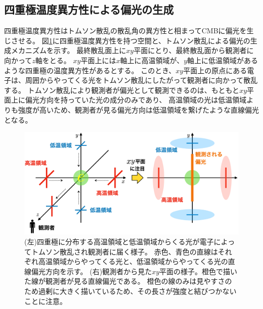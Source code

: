 \documentclass[../../main.tex]{subfiles}
\begin{document}
\subsection{四重極温度異方性による偏光の生成}
四重極温度異方性はトムソン散乱の散乱角の異方性と相まってCMBに偏光を生じさせる。
図\ref{fig:thomson_polarization}に四重極温度異方性を持つ空間と、トムソン散乱による偏光の生成メカニズムを示す。
最終散乱面上に$xy$平面にとり、最終散乱面から観測者に向かって$z$軸をとる。
$xy$平面上には$x$軸上に高温領域が、$y$軸上に低温領域があるような四重極の温度異方性があるとする。
このとき、$xy$平面上の原点にある電子は、周囲からやってくる光をトムソン散乱にしたがって観測者に向かって散乱する。
トムソン散乱により観測者が偏光として観測できるのは、もともと$xy$平面上に偏光方向を持っていた光の成分のみであり、
高温領域の光は低温領域よりも強度が高いため、観測者が見る偏光方向は低温領域を繋げたような直線偏光となる。
\begin{figure}[H]
    \centering
    \includegraphics[width=1.0\textwidth]{intro/thomson_polarization.pdf}
    \caption{(左)四重極に分布する高温領域と低温領域からくる光が電子によってトムソン散乱され観測者に届く様子。
    赤色、青色の直線はそれぞれ高温領域からやってくる光と、低温領域からやってくる光の直線偏光方向を示す。
    (右)観測者から見た$xy$平面の様子。橙色で描いた線が観測者が見る直線偏光である。
    橙色の線のみは見やすさのため過剰に大きく描いているため、その長さが強度と結びつかないことに注意。}
    \label{fig:thomson_polarization}
\end{figure}
\end{document}
